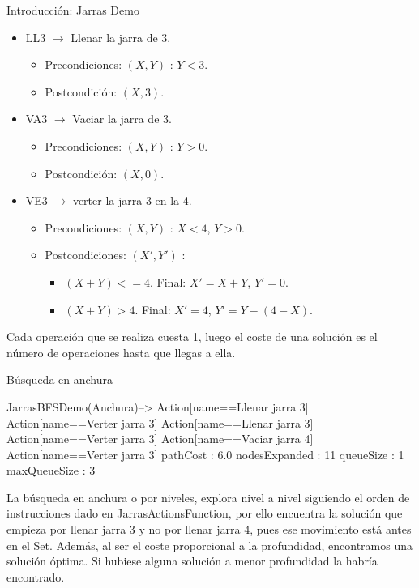 \documentclass[11pt, a4paper, spanish, openright, twoside]{book}
\begin{document}
\begin{section}{Introducción: Jarras Demo}
\begin{itemize}
		\item LL3 $\rightarrow$ Llenar la jarra de 3.
			\begin{itemize}
			\item Precondiciones: $(X, Y)$ : $Y < 3$.
			\item Postcondición: $(X, 3)$.
			\end{itemize}
		
		\item VA3 $\rightarrow$ Vaciar la jarra de 3.
			\begin{itemize}
			\item Precondiciones: $(X, Y)$ : $Y > 0$.
			\item Postcondición: $(X, 0)$.
			\end{itemize}
		\item VE3 $\rightarrow$ verter la jarra 3 en la 4.
			\begin{itemize}
			\item Precondiciones: $(X, Y)$ : $X < 4$, $Y > 0$.
			\item Postcondiciones: $(X', Y')$ : 
				\begin{itemize}
					\item $(X + Y) <= 4$.  Final: $X'= X + Y$, $Y' = 0$.
					\item $(X + Y) > 4$. Final: $X'= 4$, $Y'= Y - (4 - X)$.
				\end{itemize}
			\end{itemize}
		\end{itemize}
	
	Cada operación que se realiza cuesta 1, luego el coste de una 
				solución es el número de operaciones hasta que llegas a ella.
		

		
\end{section}

\begin{section}{Búsqueda en anchura}
	
JarrasBFSDemo(Anchura)-->
Action[name==Llenar jarra 3]
Action[name==Verter jarra 3]
Action[name==Llenar jarra 3]
Action[name==Verter jarra 3]
Action[name==Vaciar jarra 4]
Action[name==Verter jarra 3]
pathCost : 6.0
nodesExpanded : 11
queueSize : 1
maxQueueSize : 3


La búsqueda en anchura o por niveles, explora nivel a nivel siguiendo el orden de instrucciones dado en JarrasActionsFunction, por ello encuentra la solución que 
empieza por llenar jarra 3 y no por llenar jarra 4, pues ese movimiento está antes en el Set. Además, al ser el coste proporcional a la profundidad, encontramos una solución óptima.
 Si hubiese alguna solución a menor profundidad la habría encontrado.
\end{section}
\end{document}
